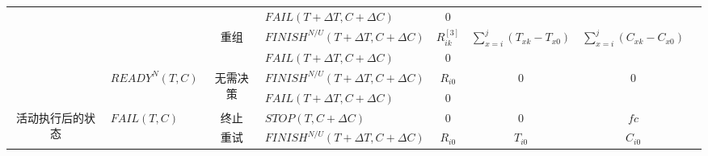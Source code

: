 \begin{table}[htbp]
\begin{lrbox}{\tablebox}
\begin{tabular}{llllllll}
        \multicolumn{1}{|c|}{} 
        &       
        & \multicolumn{1}{|c}{} 
        & \multicolumn{1}{|l}{$FAIL(T+\Delta T,C+\Delta C)$} 
        & \multicolumn{1}{|c}{0} 
        & \multicolumn{1}{|c}{} 
        & \multicolumn{1}{|c|}{} \\
        \cline{3-7}

        \multicolumn{1}{|c|}{} 
        &       
        & \multicolumn{1}{|c}{\multirow{2}{*}{重组}} 
        & \multicolumn{1}{|l}{$FINISH^{N/U}(T+\Delta T,C+\Delta C)$} 
        & \multicolumn{1}{|c}{$R_{ik}^{[3]}$} 
        & \multicolumn{1}{|c}{\multirow{2}{*}{$\sum\limits_{x = i}^j {({T_{xk}} - {T_{x0}})} $}}
        & \multicolumn{1}{|c|}{\multirow{2}{*}{$\sum\limits_{x = i}^j {({C_{xk}} - {C_{x0}})} $}} \\

        \multicolumn{1}{|c|}{} 
        &       
        & \multicolumn{1}{|c}{} 
        & \multicolumn{1}{|l}{$FAIL(T+\Delta T,C+\Delta C)$} 
        & \multicolumn{1}{|c}{0} 
        & \multicolumn{1}{|c}{}
        & \multicolumn{1}{|c|}{} \\
        \cline{2-7}

        \multicolumn{1}{|c|}{} 
        & \multirow{2}{*}{$READY^N(T,C)$} 
        & \multicolumn{1}{|c}{\multirow{2}{*}{无需决策}} 
        & \multicolumn{1}{|l}{$FINISH^{N/U}(T+\Delta T,C+\Delta C)$} 
        & \multicolumn{1}{|c}{$R_{i0}$} 
        & \multicolumn{1}{|c}{\multirow{2}{*}{0}} 
        & \multicolumn{1}{|c|}{\multirow{2}{*}{0}} \\

        \multicolumn{1}{|c|}{} 
        &       
        & \multicolumn{1}{|c}{} 
        & \multicolumn{1}{|l}{$FAIL(T+\Delta T,C+\Delta C)$} 
        & \multicolumn{1}{|c}{0} 
        & \multicolumn{1}{|c}{} 
        & \multicolumn{1}{|c|}{} \\
        \cline{1-7}

        \multicolumn{1}{|c|}{\multirow{11}{*}{\parbox{1em}{活动执行后的状态}}} 
        & \multirow{7}{*}{$FAIL(T,C)$} 
        & \multicolumn{1}{|c}{终止} 
        & \multicolumn{1}{|l}{$STOP(T,C+\Delta C)$} 
        & \multicolumn{1}{|c}{0} 
        & \multicolumn{1}{|c}{0} 
        & \multicolumn{1}{|c|}{$fc$} \\
        \cline{3-7}

        \multicolumn{1}{|c|}{} 
        &       
        & \multicolumn{1}{|c}{\multirow{2}{*}{重试}} 
        & \multicolumn{1}{|l}{$FINISH^{N/U}(T+\Delta T,C+\Delta C)$} 
        & \multicolumn{1}{|c}{$R_{i0}$} 
        & \multicolumn{1}{|c}{\multirow{2}{*}{$T_{i0}$}} 
        & \multicolumn{1}{|c|}{\multirow{2}{*}{$C_{i0}$}} \\


\end{tabular}
\end{lrbox}
\end{table}
